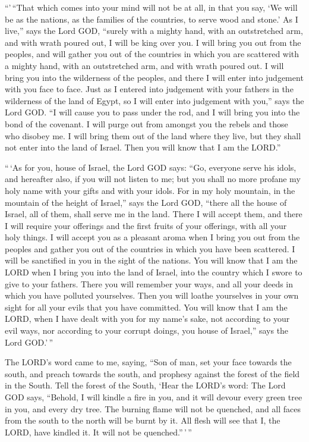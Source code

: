  ``'\,``That which comes into your mind will not be at all,
in that you say, `We will be as the nations, as the families of the
countries, to serve wood and stone.'  As I live,'' says the
Lord GOD, ``surely with a mighty hand, with an outstretched arm, and
with wrath poured out, I will be king over you.  I will
bring you out from the peoples, and will gather you out of the countries
in which you are scattered with a mighty hand, with an outstretched arm,
and with wrath poured out.  I will bring you into the
wilderness of the peoples, and there I will enter into judgement with
you face to face.  Just as I entered into judgement with
your fathers in the wilderness of the land of Egypt, so I will enter
into judgement with you,'' says the Lord GOD.  ``I will
cause you to pass under the rod, and I will bring you into the bond of
the covenant.  I will purge out from amongst you the rebels
and those who disobey me. I will bring them out of the land where they
live, but they shall not enter into the land of Israel. Then you will
know that I am the LORD.''

 ``\,`As for you, house of Israel, the Lord GOD says: ``Go,
everyone serve his idols, and hereafter also, if you will not listen to
me; but you shall no more profane my holy name with your gifts and with
your idols.  For in my holy mountain, in the mountain of
the height of Israel,'' says the Lord GOD, ``there all the house of
Israel, all of them, shall serve me in the land. There I will accept
them, and there I will require your offerings and the first fruits of
your offerings, with all your holy things.  I will accept
you as a pleasant aroma when I bring you out from the peoples and gather
you out of the countries in which you have been scattered. I will be
sanctified in you in the sight of the nations.  You will
know that I am the LORD when I bring you into the land of Israel, into
the country which I swore to give to your fathers.  There
you will remember your ways, and all your deeds in which you have
polluted yourselves. Then you will loathe yourselves in your own sight
for all your evils that you have committed.  You will know
that I am the LORD, when I have dealt with you for my name's sake, not
according to your evil ways, nor according to your corrupt doings, you
house of Israel,'' says the Lord GOD.'\,''

 The LORD's word came to me, saying,  ``Son of
man, set your face towards the south, and preach towards the south, and
prophesy against the forest of the field in the South. 
Tell the forest of the South, `Hear the LORD's word: The Lord GOD says,
``Behold, I will kindle a fire in you, and it will devour every green
tree in you, and every dry tree. The burning flame will not be quenched,
and all faces from the south to the north will be burnt by it.
 All flesh will see that I, the LORD, have kindled it. It
will not be quenched.''\,'\,''

